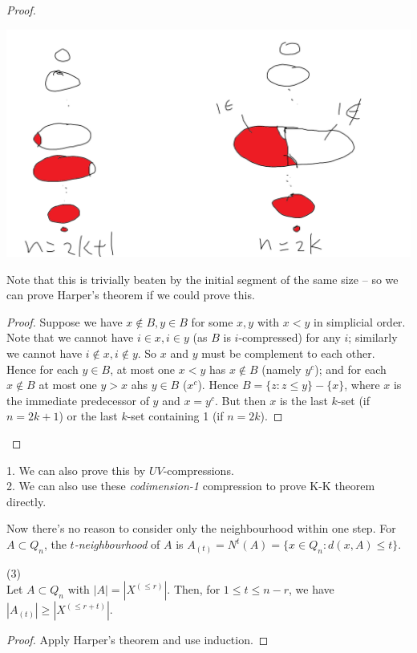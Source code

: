 \documentclass[a4paper]{article}
\begin{document}
\begin{thm}
\begin{proof}
\begin{lemma}
            \includegraphics[scale=0.5]{image/Comb_02.png}

            Note that this is trivially beaten by the initial segment of the same size -- so we can prove Harper's theorem if we could prove this.
            \begin{proof}
                Suppose we have $x \not\in B, y \in B$ for some $x,y$ with $x<y$ in simplicial order. Note that we cannot have $i \in x, i \in y$ (as $B$ is $i$-compressed) for any $i$; similarly we cannot have $i \not\in x, i \not\in y$. So $x$ and $y$ must be complement to each other.\\
                Hence for each $y \in B$, at most one $x<y$ has $x \not\in B$ (namely $y^c$); and for each $x\not\in B$ at most one $y>x$ ahs $y \in B$ ($x^c$). Hence $B=\{z:z \leq y\} - \{x\}$, where $x$ is the immediate predecessor of $y$ and $x=y^c$. But then $x$ is the last $k$-set (if $n=2k+1$) or the last $k$-set containing 1 (if $n=2k$).
            \end{proof}
        \end{lemma}
    \end{proof}
\end{thm}

\begin{rem}
    1. We can also prove this by $UV$-compressions.\\
    2. We can also use these \emph{codimension-1} compression to prove K-K theorem directly.
\end{rem}

Now there's no reason to consider only the neighbourhood within one step. For $A \subset Q_n$, the \emph{$t$-neighbourhood} of $A$ is $A_{(t)} = N^t (A) = \{x \in Q_n: d(x,A) \leq t\}$.

\begin{coro} (3)\\
    Let $A \subset Q_n$ with $|A| = |X^{(\leq r)}|$. Then, for $1 \leq t \leq n-r$, we have $|A_{(t)}| \geq |X^{(\leq r+t)}|$.
    \begin{proof}
        Apply Harper's theorem and use induction.
    \end{proof}
\end{coro}
\end{document}
